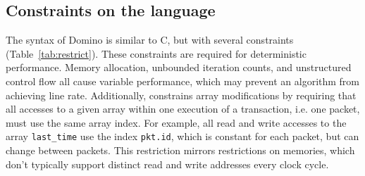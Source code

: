 \subsection{Constraints on the language}
\label{ss:constraints}

The syntax of Domino is similar to C, but with several constraints
(Table~\ref{tab:restrict}).  These constraints are required for deterministic
performance.  Memory allocation, unbounded iteration counts, and unstructured
control flow all cause variable performance, which may prevent an algorithm
from achieving line rate.  Additionally, \pktlanguage constrains array
modifications by requiring that all accesses to a given array within one
execution of a transaction, i.e. one packet, must use the same array index. For
example, all read and write accesses to the array \texttt{last\_time} use the
index \texttt{pkt.id}, which is constant for each packet, but can change
between packets. This restriction mirrors restrictions on memories, which don't
typically support distinct read and write addresses every clock cycle.

